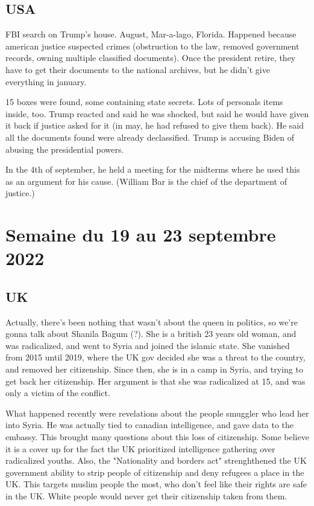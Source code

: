 \documentclass[a4paper,12pt]{book}
\begin{document}
\subsection{USA}
FBI search on Trump's house. August, Mar-a-lago, Florida. Happened because american justice suspected crimes (obstruction to the law, removed government records, owning multiple classified documents). Once the president retire, they have to get their documents to the national archives, but he didn't give everything in january.
\par 15 boxes were found, some containing state secrets. Lots of personals items inside, too. Trump reacted and said he was shocked, but said he would have given it back if justice asked for it (in may, he had refused to give them back). He said all the documents found were already declassified. Trump is accusing Biden of abusing the presidential powers.
\par In the 4th of september, he held a meeting for the midterms where he used this as an argument for his cause. (William Bar is the chief of the department of justice.)


\section{Semaine du 19 au 23 septembre 2022}
\subsection{UK}
Actually, there's been nothing that wasn't about the queen in politics, so we're gonna talk about Shanila Bagum (?). She is a british 23 years old woman, and was radicalized, and went to Syria and joined the islamic state. She vanished from 2015 until 2019, where the UK gov decided she was a threat to the country, and removed her citizenship. Since then, she is in a camp in Syria, and trying to get back her citizenship. Her argument is that she was radicalized at 15, and was only a victim of the conflict.
\par What happened recently were revelations about the people smuggler who lead her into Syria. He was actually tied to canadian intelligence, and gave data to the embassy. This brought many questions about this loss of citizenship. Some believe it is a cover up for the fact the UK prioritized intelligence gathering over radicalized youths. Also, the "Nationality and borders act" strenghthened the UK government ability to strip people of citizenship and deny refugees a place in the UK. This targets muslim people the most, who don't feel like their rights are safe in the UK. White people would never get their citizenship taken from them.
\end{document}
